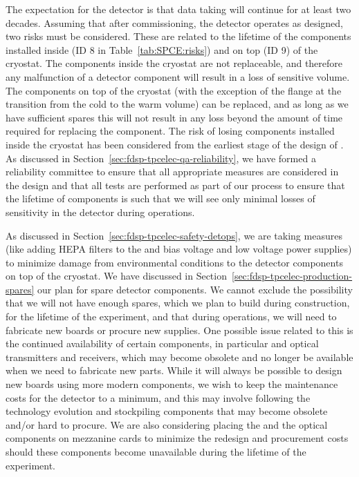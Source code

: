 The expectation for the  detector is that data taking will continue
for at least two decades. Assuming that after commissioning, the
detector operates as designed, two risks must be considered.
These are related to the lifetime of the  components
installed inside (ID 8 in Table~\ref{tab:SPCE:risks}) and on top (ID 9)
of the cryostat. The components inside the cryostat are not replaceable,
and therefore any malfunction of a detector component will result in
a loss of sensitive volume. The components on top of the cryostat
(with the exception of the flange at the transition from the cold to
the warm volume) can be replaced, and as long as we have sufficient
spares this will not result in any loss beyond the amount 
of time required for replacing the component. The risk of losing components installed inside the cryostat has been considered
from the earliest stage of the design of . As discussed
in Section~\ref{sec:fdsp-tpcelec-qa-reliability}, we have formed a 
reliability committee to ensure that all appropriate measures
are considered in the design and that all tests are performed
as part of our  process to ensure that the lifetime of components is
such that we will see only minimal losses of sensitivity in the 
detector during operations. 

As discussed in Section~\ref{sec:fdsp-tpcelec-safety-detops}, we
are taking measures (like adding HEPA filters to the
 and bias voltage and low voltage power supplies) to
minimize damage from environmental conditions to the 
detector components on top of the cryostat. We have discussed in
Section~\ref{sec:fdsp-tpcelec-production-spares} our plan for 
spare detector components. We cannot exclude the possibility that we will not have enough
spares, which we plan to build during construction, for the lifetime of the experiment, and that during 
operations, we will need to fabricate new boards or procure new
supplies. One possible issue related to this is the 
continued availability of certain components, in particular
 and optical transmitters and receivers, which may 
become obsolete and no longer be available when we need to fabricate new
parts. While it will always be 
possible to design new boards using more modern components, we
wish to keep the maintenance costs for the detector to a minimum,
and this may involve following the technology evolution and stockpiling components that may become obsolete
and/or hard to procure. We are also considering placing the
 and the optical components on mezzanine cards
to minimize the redesign and procurement costs should these 
components become unavailable during the lifetime of the experiment.
